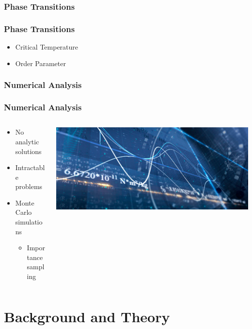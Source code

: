 \documentclass{beamer}
\begin{document}
  \subsubsection*{Phase Transitions}
  \begin{frame}
    \frametitle{Phase Transitions}
    	\begin{itemize}
    		\item Critical Temperature
    		\item Order Parameter
    	\end{itemize}
  \end{frame}
  \subsubsection*{Numerical Analysis}
  \begin{frame}
    \frametitle{Numerical Analysis}
    \begin{columns}[t]
    	\begin{column}[T]{4.7cm}
    		\begin{itemize}
    			\item No analytic solutions
    			\item Intractable problems
    			\item Monte Carlo simulations
    			\begin{itemize}
    				\item Importance sampling
    			\end{itemize}
    			\end{itemize}
    	\end{column}
    	\begin{column}[T]{7cm}
  			\includegraphics[scale=0.25]{numerical_analysis}
  		\end{column}
		\end{columns}	
  \end{frame}

	\section{Background and Theory}
	
\end{document}
